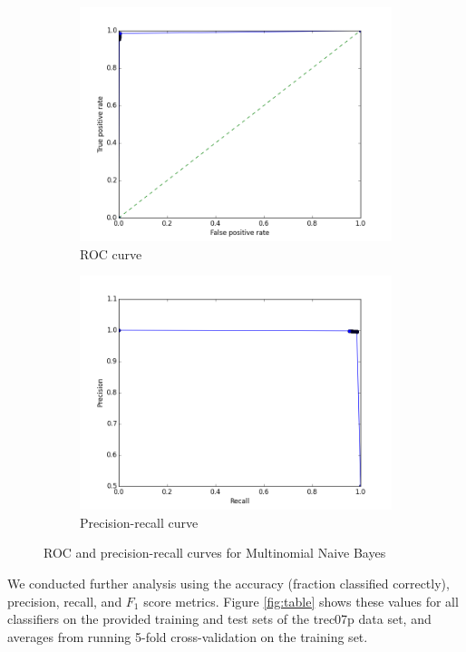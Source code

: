 \documentclass{article} %
\begin{document}
\begin{figure}[h]
  \centering
  \begin{subfigure}{0.35\textwidth}
    \includegraphics[width=\textwidth]{images/naive_bayes_roc_curve.png}
    \caption{ROC curve}
  \end{subfigure}
  \begin{subfigure}{0.35\textwidth}
    \includegraphics[width=\textwidth]{images/naive_bayes_pr_curve.png}
    \caption{Precision-recall curve}
  \end{subfigure}
  \caption{ROC and precision-recall curves for Multinomial Naive Bayes}
  \label{fig:nb}
\end{figure}

We conducted further analysis using the accuracy (fraction classified correctly), precision, recall, and $F_1$ score metrics. Figure \ref{fig:table} shows these values for all classifiers on the provided training and test sets of the trec07p data set, and averages from running 5-fold cross-validation on the training set. 
\end{document}
